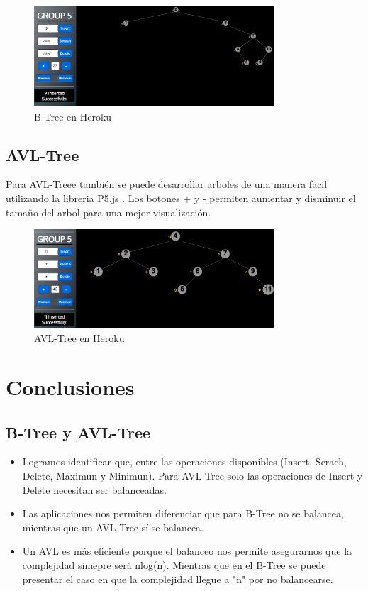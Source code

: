 \documentclass{article}
\begin{document}
        \begin{figure}[H]
        \centering
        \includegraphics[width=0.8\textwidth]{img/btree_result.PNG}
        \caption{B-Tree en Heroku}
        \end{figure}

\subsection{AVL-Tree}


Para AVL-Treee  también se puede desarrollar arboles de una manera facil utilizando la libreria P5.js .
Los botones + y - permiten aumentar y disminuir el tamaño del arbol para una mejor visualización.

        \begin{figure}[H]
        \centering
        \includegraphics[width=0.8\textwidth]{img/avl_resultados.PNG}
        \caption{AVL-Tree en Heroku}
        \end{figure}

\section{Conclusiones}
    \subsection{B-Tree y AVL-Tree } 
    \begin{itemize}
        \item Logramos identificar que, entre las operaciones disponibles (Insert, Serach, Delete, Maximun y Minimun). Para AVL-Tree solo las operaciones de Insert y Delete necesitan ser balanceadas.
        \item Las aplicaciones nos permiten diferenciar  que para B-Tree no se balancea,  mientras que un AVL-Tree sí se balancea.
        \item Un AVL es más eficiente porque el balanceo nos permite asegurarnos que la complejidad simepre será nlog(n). Mientras que en el B-Tree se puede presentar el caso en que la complejidad llegue a "n" por no balancearse. 
       
    \end{itemize}

	
	
	
\end{document}
